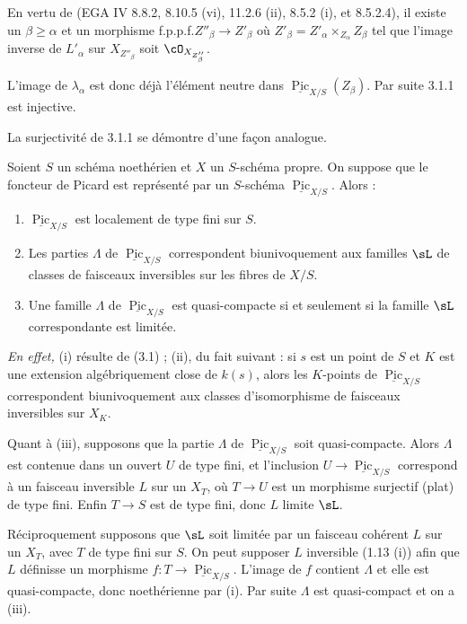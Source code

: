 \noindent
En vertu de (EGA IV 8.8.2, 8.10.5 (vi), 11.2.6 (ii), 8.5.2 (i), et 8.5.2.4), il existe un $\beta \geq \alpha$ et un morphisme f.p.p.f.\@ $Z''_{\beta} \to Z'_{\beta}$ où $Z'_{\beta} = Z'_{\alpha} \times_{Z_{\alpha}} Z_{\beta}$ tel que l'image inverse de $L'_{\alpha}$ sur $X_{Z''_{\beta}}$ soit $\cO_{X_{Z''_{\beta}}}$.

L'image de $\lambda_{\alpha}$ est donc déjà l'élément neutre dans $\underline{\operatorname{Pic}}_{X/S}(Z_{\beta})$. Par suite 3.1.1 est injective.

La surjectivité de 3.1.1 se démontre d'une façon analogue.

\begin{prop}\label{prop:3.2} Soient $S$ un schéma noethérien et $X$ un $S$-schéma propre. On suppose que le foncteur de Picard est représenté par un $S$-schéma $\underline{\operatorname{Pic}}_{X/S}$. Alors :
\begin{enumerate}[label={\roman*)}]
\item $\underline{\operatorname{Pic}}_{X/S}$ est localement de type fini sur $S$.
\item Les parties $\Lambda$ de $\underline{\operatorname{Pic}}_{X/S}$ correspondent biunivoquement aux familles $\sL$ de classes de faisceaux inversibles sur les fibres de $X/S$.
\item Une famille $\Lambda$ de $\underline{\operatorname{Pic}}_{X/S}$ est quasi-compacte si et seulement si la famille $\sL$ correspondante est limitée.
\end{enumerate}
\end{prop}

\noindent\textit{En effet,} (i) résulte de (3.1) ; (ii), du fait suivant : si $s$ est un point de $S$ et $K$ est une extension algébriquement close de $k(s)$, alors les $K$-points de $\underline{\operatorname{Pic}}_{X/S}$ correspondent biunivoquement aux classes d'isomorphisme de faisceaux inversibles sur $X_K$.

Quant à (iii), supposons que la partie $\Lambda$ de $\underline{\operatorname{Pic}}_{X/S}$ soit quasi-compacte. Alors $\Lambda$ est contenue dans un ouvert $U$ de type fini, et l'inclusion $U \to \underline{\operatorname{Pic}}_{X/S}$ correspond à un faisceau inversible $L$ sur un $X_T$, où $T \to U$ est un morphisme surjectif (plat) de type fini. Enfin $T \to S$ est de type fini, donc $L$ limite $\sL$.

Réciproquement supposons que $\sL$ soit limitée par un faisceau cohérent $L$ sur un $X_T$, avec $T$ de type fini sur $S$. On peut supposer $L$ inversible (1.13 (i)) afin que $L$ définisse un morphisme $f : T \to \underline{\operatorname{Pic}}_{X/S}$. L'image de $f$ contient $\Lambda$ et elle est quasi-compacte, donc noethérienne par (i). Par suite $\Lambda$ est quasi-compact et on a (iii).

